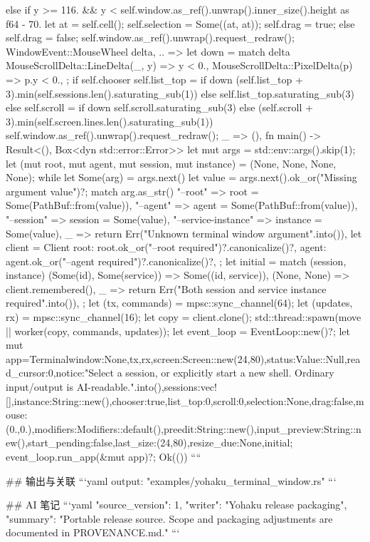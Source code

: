 {{{{{{{                        }
                    } else if y >= 116.
                        && y < self.window.as_ref().unwrap().inner_size().height as f64 - 70.
                    {
                        let at = self.cell();
                        self.selection = Some((at, at));
                        self.drag = true;
                    }
                } else {
                    self.drag = false;
                }
                self.window.as_ref().unwrap().request_redraw();
            }
            WindowEvent::MouseWheel { delta, .. } => {
                let down = match delta {
                    MouseScrollDelta::LineDelta(_, y) => y < 0.,
                    MouseScrollDelta::PixelDelta(p) => p.y < 0.,
                };
                if self.chooser {
                    self.list_top = if down {
                        (self.list_top + 3).min(self.sessions.len().saturating_sub(1))
                    } else {
                        self.list_top.saturating_sub(3)
                    }
                } else {
                    self.scroll = if down {
                        self.scroll.saturating_sub(3)
                    } else {
                        (self.scroll + 3).min(self.screen.lines.len().saturating_sub(1))
                    }
                }
                self.window.as_ref().unwrap().request_redraw();
            }
            _ => (),
        }
    }
}
fn main() -> Result<(), Box<dyn std::error::Error>> {
    let mut args = std::env::args().skip(1);
    let (mut root, mut agent, mut session, mut instance) = (None, None, None, None);
    while let Some(arg) = args.next() {
        let value = args.next().ok_or("Missing argument value")?;
        match arg.as_str() {
            "--root" => root = Some(PathBuf::from(value)),
            "--agent" => agent = Some(PathBuf::from(value)),
            "--session" => session = Some(value),
            "--service-instance" => instance = Some(value),
            _ => return Err("Unknown terminal window argument".into()),
        }
    }
    let client = Client {
        root: root.ok_or("--root required")?.canonicalize()?,
        agent: agent.ok_or("--agent required")?.canonicalize()?,
    };
    let initial = match (session, instance) {
        (Some(id), Some(service)) => Some((id, service)),
        (None, None) => client.remembered(),
        _ => return Err("Both session and service instance required".into()),
    };
    let (tx, commands) = mpsc::sync_channel(64);
    let (updates, rx) = mpsc::sync_channel(16);
    let copy = client.clone();
    std::thread::spawn(move || worker(copy, commands, updates));
    let event_loop = EventLoop::new()?;
    let mut app=Terminal{window:None,tx,rx,screen:Screen::new(24,80),status:Value::Null,read_cursor:0,notice:"Select a session, or explicitly start a new shell. Ordinary input/output is AI-readable.".into(),sessions:vec![],instance:String::new(),chooser:true,list_top:0,scroll:0,selection:None,drag:false,mouse:(0.,0.),modifiers:Modifiers::default(),preedit:String::new(),input_preview:String::new(),start_pending:false,last_size:(24,80),resize_due:None,initial};
    event_loop.run_app(&mut app)?;
    Ok(())
}
````

## 输出与关联
```yaml
output: "examples/yohaku_terminal_window.rs"
```

## AI 笔记
```yaml
{"source_version": 1, "writer": "Yohaku release packaging", "summary": "Portable release source. Scope and packaging adjustments are documented in PROVENANCE.md."}
```
